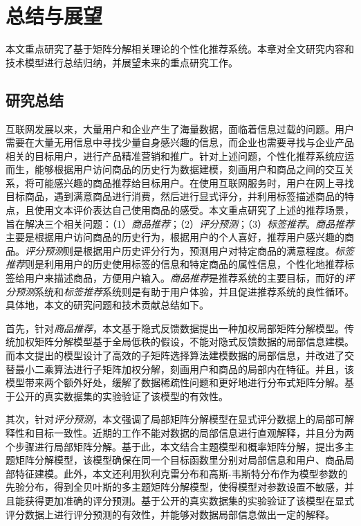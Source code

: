 \chapter{总结与展望}

本文重点研究了基于矩阵分解相关理论的个性化推荐系统。本章对全文研究内容和技术模型进行总结归纳，并展望未来的重点研究工作。

\section{研究总结}


互联网发展以来，大量用户和企业产生了海量数据，面临着信息过载的问题。用户需要在大量无用信息中寻找少量自身感兴趣的信息，而企业也需要寻找与企业产品相关的目标用户，进行产品精准营销和推广。针对上述问题，个性化推荐系统应运而生，能够根据用户访问商品的历史行为数据建模，刻画用户和商品之间的交互关系，将可能感兴趣的商品推荐给目标用户。在使用互联网服务时，用户在网上寻找目标商品，遇到满意商品进行消费，然后进行显式评分，并利用标签描述商品的特点，且使用文本评价表达自己使用商品的感受。本文重点研究了上述的推荐场景，旨在解决三个相关问题：（1）\textit{商品推荐}；（2）\textit{评分预测}；（3）\textit{标签推荐}。\textit{商品推荐}主要是根据用户访问商品的历史行为，根据用户的个人喜好，推荐用户感兴趣的商品。\textit{评分预测}则是根据用户历史评分行为，预测用户对特定商品的满意程度。\textit{标签推荐}则是利用用户的历史使用标签的信息和特定商品的属性信息，个性化地推荐标签给用户来描述商品，方便用户输入。\textit{商品推荐}是推荐系统的主要目标，而好的\textit{评分预测}系统和\textit{标签推荐}系统则是有助于用户体验，并且促进推荐系统的良性循环。具体地，本文的研究问题和技术贡献总结如下。

首先，针对\textit{商品推荐}，本文基于隐式反馈数据提出一种加权局部矩阵分解模型。传统加权矩阵分解模型基于全局低秩的假设，不能对隐式反馈数据的局部信息建模。而本文提出的模型设计了高效的子矩阵选择算法建模数据的局部信息，并改进了交替最小二乘算法进行子矩阵加权分解，刻画用户和商品的局部内在特征。并且，该模型带来两个额外好处，缓解了数据稀疏性问题和更好地进行分布式矩阵分解。基于公开的真实数据集的实验验证了该模型的有效性。

其次，针对\textit{评分预测}，本文强调了局部矩阵分解模型在显式评分数据上的局部可解释性和目标一致性。近期的工作不能对数据的局部信息进行直观解释，并且分为两个步骤进行局部矩阵分解。基于此，本文结合主题模型和概率矩阵分解，提出多主题矩阵分解模型，该模型确保在同⼀个⽬标函数⾥分别对局部信息和用户、商品局部特征建模。此外，本文还利用狄利克雷分布和高斯-韦斯特分布作为模型参数的先验分布，得到全贝叶斯的多主题矩阵分解模型，使得模型对参数设置不敏感，并且能获得更加准确的评分预测。基于公开的真实数据集的实验验证了该模型在显式评分数据上进行评分预测的有效性，并能够对数据局部信息做出一定的解释。
	
